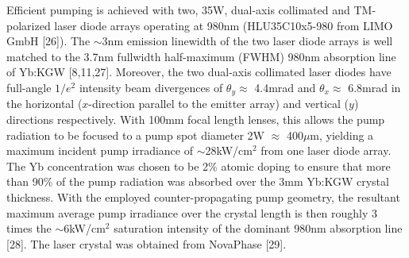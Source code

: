 Efficient pumping is achieved with two, 35W, dual-axis collimated and TM-polarized laser diode arrays operating at 980nm (HLU35C10x5-980 from LIMO GmbH [26]).
The $\sim$3nm emission linewidth of the two laser diode arrays is well matched to the 3.7nm fullwidth half-maximum (FWHM) 980nm absorption line of Yb:KGW [8,11,27].
Moreover, the two dual-axis collimated laser diodes have full-angle $1/e^2$ intensity beam divergences of $\theta_y \approx$ 4.4mrad and $\theta_x \approx$ 6.8mrad in the horizontal ($x$-direction parallel to the emitter array) and vertical ($y$) directions respectively. 
With 100mm focal length lenses, this allows the pump radiation to be focused to a pump spot diameter 2W $\approx$ 400$\mu$m, yielding a maximum incident pump irradiance of $\sim$28kW/cm$^2$ from one laser diode array.
The Yb concentration was chosen to be 2\% atomic doping to ensure that more than 90\% of the pump radiation was absorbed over the 3mm Yb:KGW crystal thickness.
With the employed counter-propagating pump geometry, the resultant maximum average pump irradiance over the crystal length is then roughly 3 times the $\sim$6kW/cm$^2$ saturation intensity of the dominant 980nm absorption line [28].
The laser crystal was obtained from NovaPhase [29].

